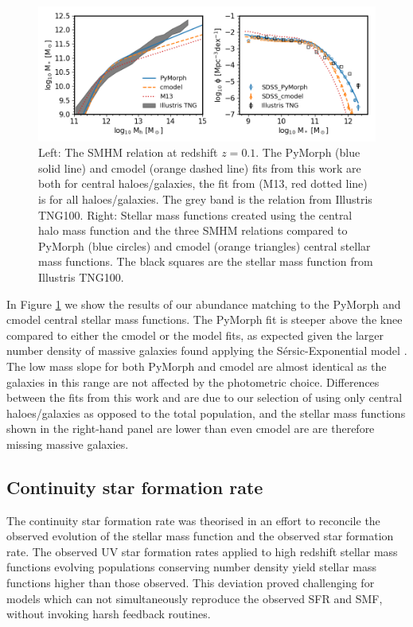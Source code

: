\begin{figure}[h]
	\centering
	\includegraphics[width = \linewidth]{Figures/Chapter2/AbundaceMtch_Data.png}
    \caption{Left: The SMHM relation at redshift $z=0.1$. The PyMorph (blue solid line) and cmodel (orange dashed line) fits from this work are both for central haloes/galaxies, the fit from \citet{Moster2013} (M13, red dotted line) is for all haloes/galaxies. The grey band is the relation from Illustris TNG100. Right: Stellar mass functions created using the central halo mass function and the three SMHM relations compared to PyMorph (blue circles) and cmodel (orange triangles) central stellar mass functions. The black squares are the stellar mass function from Illustris TNG100.}
	\label{fig:Abn_Data}
\end{figure}

In Figure \ref{fig:Abn_Data} we show the results of our abundance matching to the PyMorph and cmodel central stellar mass functions. The PyMorph fit is steeper above the knee compared to either the cmodel or the \citet{Moster2013} model fits, as expected given the larger number density of massive galaxies found applying the S\'ersic-Exponential model \citep[eg.,][]{Shankar2014, Kravtsov2018StellarHalos}. The low mass slope for both PyMorph and cmodel are almost identical as the galaxies in this range are not affected by the photometric choice. Differences between the fits from this work and \citet{Moster2013} are due to our selection of using only central haloes/galaxies as opposed to the total population, and the stellar mass functions shown in the right-hand panel are lower than even cmodel are are therefore missing massive galaxies.


\subsection{Continuity star formation rate}

The continuity star formation rate was theorised in an effort to reconcile the observed evolution of the stellar mass function and the observed star formation rate. The observed UV star formation rates applied to high redshift stellar mass functions evolving populations conserving number density yield stellar mass functions higher than those observed. This deviation proved challenging for models which can not simultaneously reproduce the observed SFR and SMF, without invoking harsh feedback routines.

